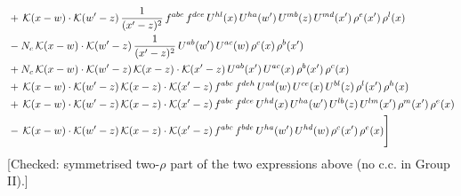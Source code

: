 \documentclass[9pt]{article}
\numberwithin{equation}{section}
\begin{document}
\begin{align}
&+\,\mathcal{K}(x-w)\cdot\mathcal{K}(w'-z)\,\frac{1}{(x'-z)^{2}}\,f^{abc}\,f^{dce}\,U^{hl}(x)\,U^{ha}(w')\,U^{mb}(z)\,U^{md}(x')\,\rho^{e}(x')\,\rho^{l}(x)\notag \\
&-N_{c}\,\mathcal{K}(x-w)\cdot\mathcal{K}(w'-z)\,\frac{1}{(x'-z)^{2}}\,U^{ab}(w')\,U^{ac}(w)\,\rho^{c}(x)\,\rho^{b}(x')\notag \\
&+N_{c}\,\mathcal{K}(x-w)\cdot\mathcal{K}(w'-z)\,\mathcal{K}(x-z)\cdot\mathcal{K}(x'-z)\,U^{ab}(x')\,U^{ac}(x)\,\rho^{b}(x')\,\rho^{c}(x)\notag \\
&+\,\mathcal{K}(x-w)\cdot\mathcal{K}(w'-z)\,\mathcal{K}(x-z)\cdot\mathcal{K}(x'-z)\,f^{abc}\,f^{deh}\,U^{ad}(w)\,U^{ce}(x)\,U^{bl}(z)\,\rho^{l}(x')\,\rho^{h}(x)\notag \\
&+\,\mathcal{K}(x-w)\cdot\mathcal{K}(w'-z)\,\mathcal{K}(x-z)\cdot\mathcal{K}(x'-z)\,f^{abc}\,f^{dce}\,U^{hd}(x)\,U^{ha}(w')\,U^{lb}(z)\,U^{lm}(x')\,\rho^{m}(x')\,\rho^{e}(x)\notag \\
&-\,\mathcal{K}(x-w)\cdot\mathcal{K}(w'-z)\,\mathcal{K}(x-z)\cdot\mathcal{K}(x'-z)\,f^{abc}\,f^{bde}\,U^{ha}(w')\,U^{hd}(w)\,\rho^{c}(x')\,\rho^{e}(x)\Bigg]
\end{align} {\color{red}[Checked: symmetrised two-$\rho$ part of the two expressions above (no c.c. in Group II).]}\par\noindent 
\end{document}
